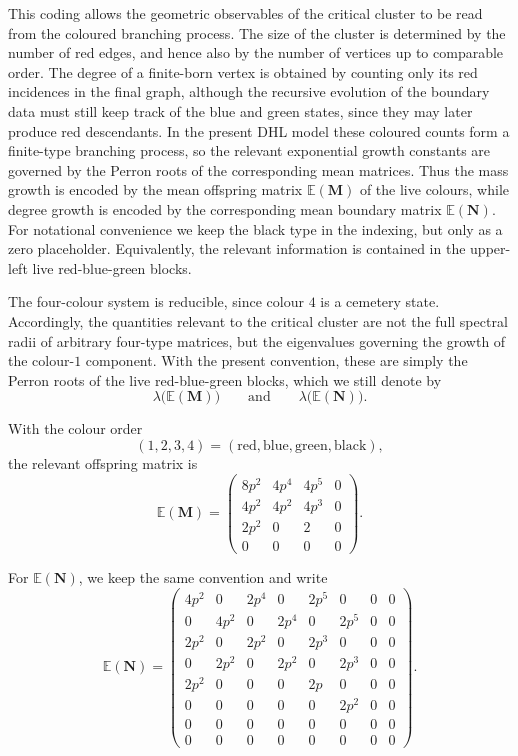 \documentclass{article}
\theoremstyle{plain}
\theoremstyle{definition}
\begin{document}
This coding allows the geometric observables of the critical cluster to be read from the coloured branching process.
The size of the cluster is determined by the number of red edges, and hence also by the number of vertices up to comparable order.
The degree of a finite-born vertex is obtained by counting only its red incidences in the final graph, although the recursive evolution of the boundary data must still keep track of the blue and green states, since they may later produce red descendants.
In the present DHL model these coloured counts form a finite-type branching process, so the relevant exponential growth constants are governed by the Perron roots of the corresponding mean matrices.
Thus the mass growth is encoded by the mean offspring matrix $\mathbb E(\mathbf M)$ of the live colours, while degree growth is encoded by the corresponding mean boundary matrix $\mathbb E(\mathbf N)$.
For notational convenience we keep the black type in the indexing, but only as a zero placeholder.
Equivalently, the relevant information is contained in the upper-left live red-blue-green blocks.

The four-colour system is reducible, since colour $4$ is a cemetery state.
Accordingly, the quantities relevant to the critical cluster are not the full spectral radii of arbitrary four-type matrices, but the eigenvalues governing the growth of the colour-$1$ component.
With the present convention, these are simply the Perron roots of the live red-blue-green blocks, which we still denote by
\[
\lambda\bigl(\mathbb E(\mathbf M)\bigr)
\qquad
\text{and}
\qquad
\lambda\bigl(\mathbb E(\mathbf N)\bigr).
\]

With the colour order
\[
(1,2,3,4)=(\mathrm{red},\mathrm{blue},\mathrm{green},\mathrm{black}),
\]
the relevant offspring matrix is
\[
\mathbb E(\mathbf M)
=
\begin{pmatrix}
8p^2 & 4p^4 & 4p^5 & 0\\
4p^2 & 4p^2 & 4p^3 & 0\\
2p^2 & 0 & 2 & 0\\
0 & 0 & 0 & 0
\end{pmatrix}.
\]

For $\mathbb E(\mathbf N)$, we keep the same convention and write
\[
\mathbb E(\mathbf N)
=
\begin{pmatrix}
4p^2&0&2p^4&0&2p^5&0&0&0\\
0&4p^2&0&2p^4&0&2p^5&0&0\\
2p^2&0&2p^2&0&2p^3&0&0&0\\
0&2p^2&0&2p^2&0&2p^3&0&0\\
2p^2&0&0&0&2p&0&0&0\\
0&0&0&0&0&2p^2&0&0\\
0&0&0&0&0&0&0&0\\
0&0&0&0&0&0&0&0
\end{pmatrix}.
\]
\end{document}

